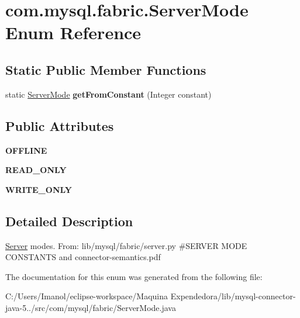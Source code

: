 \hypertarget{enumcom_1_1mysql_1_1fabric_1_1_server_mode}{}\section{com.\+mysql.\+fabric.\+Server\+Mode Enum Reference}
\label{enumcom_1_1mysql_1_1fabric_1_1_server_mode}
\subsection*{Static Public Member Functions}
\begin{DoxyCompactItemize}
\item 
\mbox{\label{enumcom_1_1mysql_1_1fabric_1_1_server_mode_afb78af34f046d0981cf98ab597e31a54}} 
static \mbox{\hyperlink{enumcom_1_1mysql_1_1fabric_1_1_server_mode}{Server\+Mode}} {\bfseries get\+From\+Constant} (Integer constant)
\end{DoxyCompactItemize}
\subsection*{Public Attributes}
\begin{DoxyCompactItemize}
\item 
\mbox{\label{enumcom_1_1mysql_1_1fabric_1_1_server_mode_ad2868c6fec8c3a1a61f00431d92d2d1a}} 
{\bfseries O\+F\+F\+L\+I\+NE}
\item 
\mbox{\label{enumcom_1_1mysql_1_1fabric_1_1_server_mode_a203ec3ae949497aafcbd24cf95d780c7}} 
{\bfseries R\+E\+A\+D\+\_\+\+O\+N\+LY}
\item 
\mbox{\label{enumcom_1_1mysql_1_1fabric_1_1_server_mode_ac1abbfcf64ad4bd2554a92bacff70a79}} 
{\bfseries W\+R\+I\+T\+E\+\_\+\+O\+N\+LY}
\end{DoxyCompactItemize}


\subsection{Detailed Description}
\mbox{\hyperlink{classcom_1_1mysql_1_1fabric_1_1_server}{Server}} modes. From\+: lib/mysql/fabric/server.\+py \#\+S\+E\+R\+V\+ER M\+O\+DE C\+O\+N\+S\+T\+A\+N\+TS and connector-\/semantics.\+pdf 

The documentation for this enum was generated from the following file\+:\begin{DoxyCompactItemize}
\item 
C\+:/\+Users/\+Imanol/eclipse-\/workspace/\+Maquina Expendedora/lib/mysql-\/connector-\/java-\/5../src/com/mysql/fabric/Server\+Mode.\+java\end{DoxyCompactItemize}
